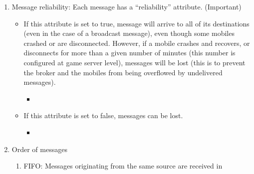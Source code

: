 \begin{enumerate}
\begin{enumerate}
\begin{enumerate}
\begin{itemize}
{  exchanges are performed using RPC mode.}
\end{itemize}
\label{R_1_b_ii}
\item Request/Response with ``future'': When an entity sends such a
  message, it continues operation and receives a delivery receipt at a
  later stage. (Important)
\begin{itemize}
\item {}
\end{itemize}
\label{R_1_b_iii}
\end{enumerate}
\item Message reliability: Each message has a ``reliability''
  attribute. (Important)
\label{R_1_c}
\begin{itemize}
\item If this attribute is set to true, message will arrive to all of
  its destinations (even in the case of a broadcast message), even
  though some mobiles crashed or are disconnected.  However, if a
  mobile crashes and recovers, or disconnects for more than a given
  number of minutes (this number is configured at game server level),
  messages will be lost (this is to prevent the broker and the mobiles
  from being overflowed by undelivered messages).
\begin{itemize}
\item {}
\end{itemize}
\item If this attribute is set to false, messages can be lost.
\begin{itemize}
\item {}
\end{itemize}
\end{itemize}
\item Order of messages
\label{R_1_d}
\begin{enumerate}
\item FIFO: Messages originating from the same source are received in

\end{enumerate}
\end{enumerate}
\end{enumerate}

